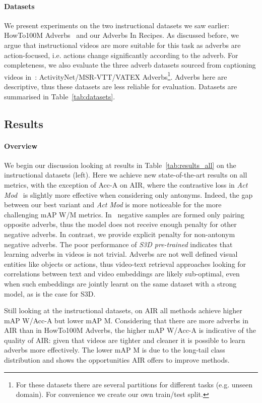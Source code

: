 \documentclass[10pt,twocolumn,letterpaper]{article}
\newcommand{\fparagraph}[1]{\paragraph{#1}}
\begin{document}
\vspace{-13pt}

\fparagraph{Datasets}
We present experiments on the two instructional datasets we saw earlier: HowTo100M Adverbs~\cite{doughty2020action} and our Adverbs In Recipes. As discussed before, we argue that instructional videos are more suitable for this task as adverbs are action-focused, i.e. actions change significantly according to the adverb. For completeness, we also evaluate the three adverb datasets sourced from captioning videos in~\cite{doughty2022you}: ActivityNet/MSR-VTT/VATEX Adverbs\footnote{For these datasets there are several partitions for different tasks (e.g. unseen domain). For convenience we create our own train/test split.}. Adverbs here are  
descriptive, thus 
these datasets are less reliable for evaluation.
Datasets are summarised in Table~\ref{tab:datasets}. 

\vspace{-3pt}
\subsection{Results}

\fparagraph{Overview} We begin our discussion looking at results in Table~\ref{tab:results_all} on the instructional datasets (left).
Here we achieve new state-of-the-art results on all metrics,
with the exception of Acc-A on AIR, where the contrastive loss in \textit{Act Mod}~\cite{doughty2020action} is slightly more effective when considering only antonyms. Indeed, the gap between our best variant 
and \textit{Act Mod} is more noticeable for the more challenging mAP W/M metrics. 
In~\cite{doughty2020action} negative samples are formed only pairing opposite adverbs, thus the model does not receive enough penalty for other negative adverbs. In contrast, we 
provide 
explicit penalty for non-antonym negative adverbs. The poor performance of 
\textit{S3D pre-trained} 
indicates that learning adverbs in videos is not trivial. 
Adverbs are not well defined visual entities like objects or actions, thus video-text retrieval approaches looking for correlations between text and video embeddings are likely sub-optimal, even when such embeddings are jointly learnt on the same dataset with a strong model, as is the case for S3D. 

Still looking at the instructional datasets, on AIR all methods achieve higher mAP W/Acc-A but lower mAP M. Considering that there are more adverbs in AIR 
than in HowTo100M Adverbs, 
the higher mAP W/Acc-A is indicative of the quality of AIR: given that videos are tighter and cleaner it is possible to learn adverbs more effectively. 
The lower mAP M is due to the long-tail class distribution and  
shows the opportunities AIR offers to improve methods. 
\end{document}
